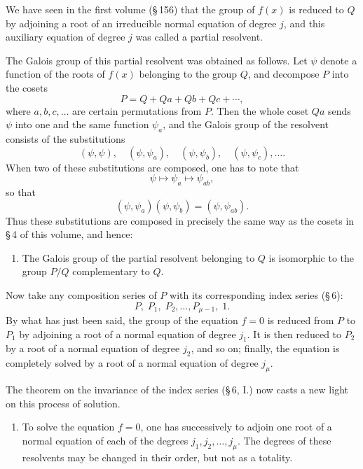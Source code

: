 \documentclass[11pt]{article}
\begin{document}
We have seen in the first volume (\S\,156) that the group of $f(x)$ is reduced to $Q$ by adjoining a root of an irreducible normal equation of degree $j$, and this auxiliary equation of degree $j$ was called a partial resolvent.

The Galois group of this partial resolvent was obtained as follows. Let $\psi$ denote a function of the roots of $f(x)$ belonging to the group $Q$, and decompose $P$ into the cosets
\[
  P=Q+Qa+Qb+Qc+\cdots ,
\]
where $a,b,c,\ldots$ are certain permutations from $P$. Then the whole coset $Qa$ sends $\psi$ into one and the same function $\psi_a$, and the Galois group of the resolvent consists of the substitutions
\[
  (\psi,\psi),\quad(\psi,\psi_a),\quad(\psi,\psi_b),\quad(\psi,\psi_c),\ldots .
\]
When two of these substitutions are composed, one has to note that
\[
  \psi\longmapsto \psi_a\longmapsto \psi_{ab},
\]
so that
\[
  (\psi,\psi_a)(\psi,\psi_b)=(\psi,\psi_{ab}).
\]
Thus these substitutions are composed in precisely the same way as the cosets in \S\,4 of this volume, and hence:

\begin{enumerate}[label=\arabic*.,leftmargin=2.6em]
\item The Galois group of the partial resolvent belonging to $Q$ is isomorphic to the group $P/Q$ complementary to $Q$.
\end{enumerate}

Now take any composition series of $P$ with its corresponding index series (\S\,6):
\begin{equation}
 P,\;P_1,\;P_2,\ldots,P_{\mu-1},\;1.
 \tag{1}
\end{equation}
By what has just been said, the group of the equation $f=0$ is reduced from $P$ to $P_1$ by adjoining a root of a normal equation of degree $j_1$. It is then reduced to $P_2$ by a root of a normal equation of degree $j_2$, and so on; finally, the equation is completely solved by a root of a normal equation of degree $j_\mu$.

The theorem on the invariance of the index series (\S\,6, I.) now casts a new light on this process of solution.

\begin{enumerate}[label=\arabic*.,leftmargin=2.6em,start=2]
\item To solve the equation $f=0$, one has successively to adjoin one root of a normal equation of each of the degrees $j_1,j_2,\ldots,j_\mu$. The degrees of these resolvents may be changed in their order, but not as a totality.
\end{enumerate}
\end{document}
